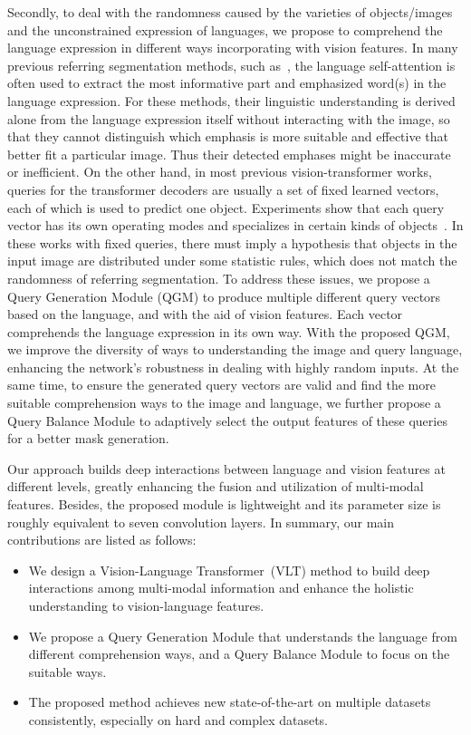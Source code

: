 \documentclass[10pt,twocolumn,letterpaper]{article}
\begin{document}
Secondly, to deal with the randomness caused by the varieties of objects/images and the unconstrained expression of languages, we propose to comprehend the language expression in different ways incorporating with vision features. In many previous referring segmentation methods, such as~\cite{luo2020multi, yu2018mattnet}, the language self-attention is often used to extract the most informative part and emphasized word(s) in the language expression. For these methods, their linguistic understanding is derived alone from the language expression itself without interacting with the image, so that they cannot distinguish which emphasis is more suitable and effective that better fit a particular image. Thus their detected emphases might be inaccurate or inefficient.
On the other hand, in most previous vision-transformer works, queries for the transformer decoders are usually a set of fixed learned vectors, each of which 
is used to predict one object. Experiments show that each query vector 
has its own operating modes and specializes in certain kinds of objects~\cite{carion2020end}. In these works with fixed queries, there must imply a hypothesis that objects in the input image are distributed under some statistic rules, which does not match the randomness of referring segmentation. 
To address these issues, we propose a Query Generation Module (QGM) to produce multiple different query vectors based on the language, and with the aid of vision features. Each vector comprehends the language expression in its own way. 
With the proposed QGM, we improve the diversity of ways to understanding the image and query language, enhancing the network's robustness in dealing with highly random inputs. At the same time, to ensure the generated query vectors are valid and find the more suitable comprehension ways to the image and language, we further propose a Query Balance Module to adaptively select the output features of these queries for a better mask generation. 






Our approach builds deep interactions between language and vision features at different levels, greatly enhancing the fusion and utilization of multi-modal features. Besides, the proposed module is lightweight and its parameter size is roughly equivalent to seven convolution layers. In summary, our main contributions are listed as follows:
\begin{itemize}
\setlength\itemsep{0em}
   \item We
design a Vision-Language Transformer~(VLT) method to build deep interactions among multi-modal information and enhance the holistic understanding to vision-language features.
   \item We propose a Query Generation Module that understands the language from different comprehension ways, and a Query Balance Module to focus on the suitable ways.
   \item The proposed method achieves new state-of-the-art on multiple datasets consistently, especially on hard and complex datasets.
\end{itemize}
\end{document}
